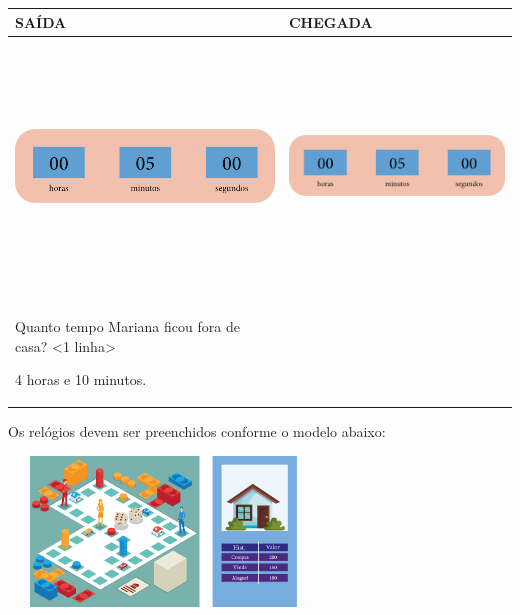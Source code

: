 \begin{longtable}[]{@{}ll@{}}
\toprule
SAÍDA & CHEGADA\tabularnewline
\midrule
\endhead
\includegraphics[width=2.71875in,height=2.65625in]{media/image61.png} &
\includegraphics[width=2.71875in,height=2.65625in]{media/image61.png}\tabularnewline
\begin{minipage}[t]{0.48\columnwidth}\raggedright\strut
Quanto tempo Mariana ficou fora de casa? \textless{}1
linha\textgreater{}

4 horas e 10 minutos.\strut
\end{minipage}\tabularnewline
\bottomrule
\end{longtable}

Os relógios devem ser preenchidos conforme o modelo abaixo:

\includegraphics[width=3.23958in,height=1.57255in]{media/image62.png}

